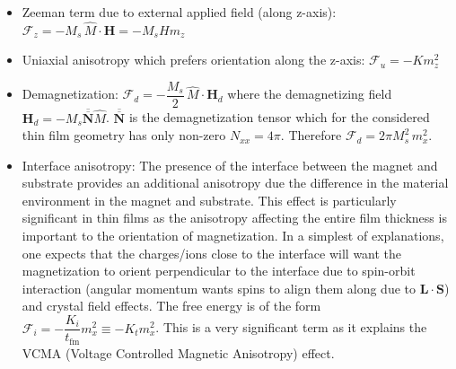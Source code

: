 \documentclass[aps,prb,onecolumn,notitlepage,showpacs,floatfix,superscriptaddress]{revtex4-1}
\newcommand{\mrm}[1]{\mathrm{#1}}
\newcommand{\fe}{ \mathcal{F}}
\begin{document}
\begin{itemize}
\item Zeeman term due to external applied field (along z-axis): $\fe_z = - M_s \, \hat{M}\cdot {\bm H} = - M_s H m_z$
\item Uniaxial anisotropy which prefers orientation along the z-axis: $\fe_u = - K m_z^2$
\item Demagnetization: $\fe_d =  - \dfrac{ M_s}{2} \, \hat{M}\cdot {\bm H}_d$ where the demagnetizing field ${\bm H}_d = - M_s \overline{\overline{\bm N}} \hat{M}$. $\overline{\overline{\bm N}}$ is the demagnetization tensor which for the considered thin film geometry has only non-zero $N_{xx} = 4\pi$. Therefore $\fe_d =   2\pi M_s^2 \, m_x^2$.
\item Interface anisotropy: The presence of the interface between the magnet and substrate provides an additional anisotropy due the difference in the material environment in the magnet and substrate. This effect is particularly significant in thin films as the anisotropy affecting the entire film thickness is important to the orientation of magnetization. In a simplest of explanations, one expects that the charges/ions close to the interface will want the magnetization to orient perpendicular to the interface due to spin-orbit interaction (angular momentum wants spins to align them along due to ${\bm L}\cdot{\bm S}$) and crystal field effects. The free energy is of the form $\fe_i = - \dfrac{K_i}{t_\mrm{fm}} m_x^2 \equiv - K_t m_x^2$. This is a very significant term as it explains the VCMA (Voltage Controlled Magnetic Anisotropy) effect.
\end{itemize}
\end{document}
